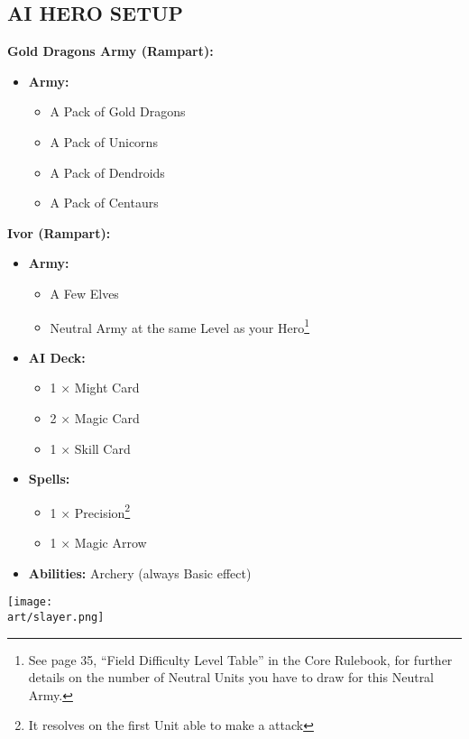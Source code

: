 \begin{multicols*}{2}
\subsection*{\MakeUppercase{AI Hero Setup}}

\textbf{Gold Dragons Army (Rampart):}
\begin{itemize}
  \item \textbf{Army:}
    \begin{itemize}
      \item A Pack of Gold Dragons
      \item A Pack of Unicorns
      \item A Pack of Dendroids
      \item A Pack of Centaurs
    \end{itemize}
\end{itemize}

\textbf{Ivor (Rampart):}
\begin{itemize}
  \item \textbf{Army:}
    \begin{itemize}
      \item A Few Elves
      \item Neutral Army at the same Level as your Hero\footnote{See page 35, ``Field Difficulty Level Table'' in the Core Rulebook, for further details on the number of Neutral Units you have to draw for this Neutral Army.}
    \end{itemize}
  \item \textbf{AI Deck:}
    \begin{itemize}
      \item 1 × Might  Card
      \item 2 × Magic  Card
      \item 1 × Skill  Card
    \end{itemize}
  \item \textbf{Spells:}
    \begin{itemize}
      \item 1 × Precision\footnote{It resolves on the first  Unit able to make a  attack}
      \item 1 × Magic Arrow
    \end{itemize}
  \item \textbf{Abilities:} Archery (always Basic effect)
\end{itemize}

\begin{center}
  {\texttt{[image: \\art/slayer.png]}}
\end{center}


\end{multicols*}
